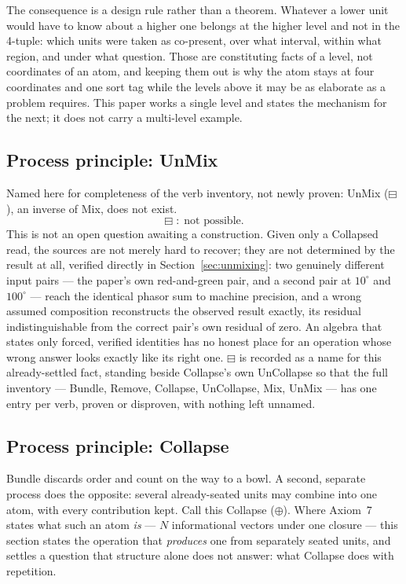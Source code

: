 \documentclass[12pt, a4paper]{article}
\begin{document}
The consequence is a design rule rather than a theorem. Whatever a
lower unit would have to know about a higher one belongs at the higher
level and not in the 4-tuple: which units were taken as co-present,
over what interval, within what region, and under what question. Those
are constituting facts of a level, not coordinates of an atom, and
keeping them out is why the atom stays at four coordinates and one
sort tag while the levels above it may be as elaborate as a problem
requires. This paper works a single level and states the mechanism for
the next; it does not carry a multi-level example.

\subsection{Process principle: UnMix}
\label{subsec:process_principle_unmix}

Named here for completeness of the verb inventory, not newly proven:
UnMix ($\boxminus$), an inverse of Mix, does not exist.
\[
\boxminus \;:\; \text{not possible.}
\]
This is not an open question awaiting a construction. Given only a
Collapsed read, the sources are not merely hard to recover; they are
not determined by the result at all, verified directly in
Section~\ref{sec:unmixing}: two genuinely different input pairs ---
the paper's own red-and-green pair, and a second pair at
$10^\circ$ and $100^\circ$ --- reach the identical phasor sum to
machine precision, and a wrong assumed composition reconstructs the
observed result exactly, its residual indistinguishable from the
correct pair's own residual of zero. An algebra that states only
forced, verified identities has no honest place for an operation
whose wrong answer looks exactly like its right one. $\boxminus$ is
recorded as a name for this already-settled fact, standing beside
Collapse's own UnCollapse so that the full inventory --- Bundle,
Remove, Collapse, UnCollapse, Mix, UnMix --- has one entry per
verb, proven or disproven, with nothing left unnamed.

\subsection{Process principle: Collapse}
\label{subsec:process_principle_collapse}

Bundle discards order and count on the way to a bowl. A second,
separate process does the opposite: several already-seated units may
combine into one atom, with every contribution kept. Call this
Collapse ($\oplus$). Where Axiom~7 states what such an atom \emph{is}
--- $N$ informational vectors under one closure --- this section
states the operation that \emph{produces} one from separately seated
units, and settles a question that structure alone does not answer:
what Collapse does with repetition.
\end{document}
